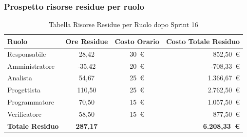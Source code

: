 \subsubsection{Prospetto risorse residue per ruolo}
\begin{table}[H]
    \centering
    \renewcommand{\arraystretch}{1.3}
    \begin{tabularx}{\textwidth}{|X|c|c|r|}
        \hline
        \textbf{Ruolo} & \textbf{Ore Residue} & \textbf{Costo Orario} &
        \textbf{Costo Totale Residuo} \\
        \hline
        Responsabile   & 28,42 & 30~\euro & 852{,}50~\euro \\
        Amministratore & -35,42 & 20~\euro & -708{,}33~\euro \\
        Analista       & 54,67 & 25~\euro & 1.366{,}67~\euro \\
        Progettista    & 110,50 & 25~\euro & 2.762{,}50~\euro \\
        Programmatore  & 70,50 & 15~\euro & 1.057{,}50~\euro \\
        Verificatore   & 58,50 & 15~\euro & 877{,}50~\euro \\
        \hline
        \textbf{Totale Residuo} & \textbf{287,17} & &
        \textbf{6.208{,}33~\euro} \\
        \hline
    \end{tabularx}
    \caption{Tabella Risorse Residue per Ruolo dopo Sprint 16}
\end{table}

